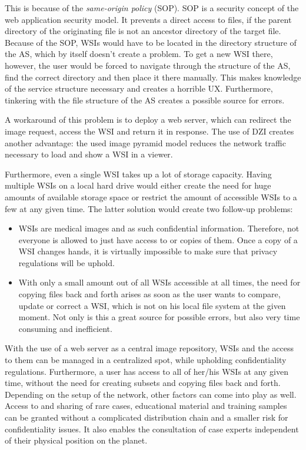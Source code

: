 This is because of the \emph{same-origin policy} (SOP). SOP is a security concept of the web application security model. It prevents a direct access to files, if the parent directory of the originating file is not an ancestor directory of the target file\cite{web:mdn}. Because of the SOP, WSIs would have to be located in the directory structure of the AS, which by itself doesn't create a problem. To get a new WSI there, however, the user would be forced to navigate through the structure of the AS, find the correct directory and then place it there manually. This makes knowledge of the service structure necessary and creates a horrible UX. Furthermore, tinkering with the file structure of the AS creates a possible source for errors.

A workaround of this problem is to deploy a web server, which can redirect the image request, access the WSI and return it in response\cite{Tseytlin14}. The use of DZI creates another advantage: the used image pyramid model reduces the network traffic necessary to load and show a WSI in a viewer\cite{Cornish13}\cite{DICOM10}.

Furthermore, even a single WSI takes up a lot of storage capacity\cite{Singh11}. Having multiple WSIs on a local hard drive would either create the need for huge amounts of available storage space or restrict the amount of accessible WSIs to a few at any given time. The latter solution would create two follow-up problems:
\begin{itemize}
	\item WSIs are medical images and as such confidential information. Therefore, not everyone is allowed to just have access to or copies of them\cite{COA}\cite{USSanDiego}. Once a copy of a WSI changes hands, it is virtually impossible to make sure that privacy regulations will be uphold.	
	\item With only a small amount out of all WSIs accessible at all times, the need for copying files back and forth arises as soon as the user wants to compare, update or correct a WSI, which is not on his local file system at the given moment. Not only is this a great source for possible errors, but also very time consuming and inefficient.
\end{itemize}

With the use of a web server as a central image repository, WSIs and the access to them can be managed in a centralized spot, while upholding confidentiality regulations. Furthermore, a user has access to all of her/his WSIs at any given time, without the need for creating subsets and copying files back and forth. Depending on the setup of the network, other factors can come into play as well. Access to and sharing of rare cases, educational material and training samples can be granted without a complicated distribution chain and a smaller risk for confidentiality issues. It also enables the consultation of case experts independent of their physical position on the planet\cite{Wilbur09}.



